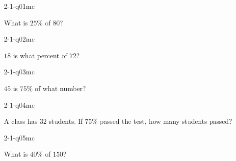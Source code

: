 

\begin{practiceQuestion}{2-1-q01}{mc}
\begin{questionText}
What is $25\%$ of $80$?
\end{questionText}
\end{practiceQuestion}

\begin{practiceQuestion}{2-1-q02}{mc}
\begin{questionText}
$18$ is what percent of $72$?
\end{questionText}
\end{practiceQuestion}

\begin{practiceQuestion}{2-1-q03}{mc}
\begin{questionText}
$45$ is $75\%$ of what number?
\end{questionText}
\end{practiceQuestion}

\begin{practiceQuestion}{2-1-q04}{mc}
\begin{questionText}
A class has $32$ students. If $75\%$ passed the test, how many students passed?
\end{questionText}
\end{practiceQuestion}

\begin{practiceQuestion}{2-1-q05}{mc}
\begin{questionText}
What is $40\%$ of $150$?
\end{questionText}
\end{practiceQuestion}

